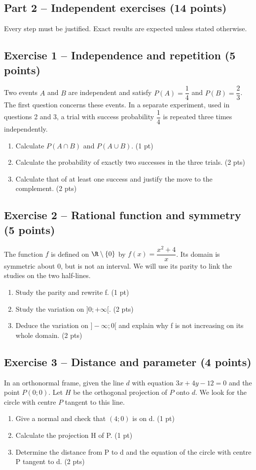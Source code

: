\clearpage\subsection*{Part 2 -- Independent exercises (14 points)}
Every step must be justified. Exact results are expected unless stated otherwise.
\subsection*{Exercise 1 -- Independence and repetition (5 points)}
Two events $A$ and $B$ are independent and satisfy $P(A)=\dfrac14$ and $P(B)=\dfrac23$. The first question concerns these events. In a separate experiment, used in questions 2 and 3, a trial with success probability $\dfrac14$ is repeated three times independently.
\begin{enumerate}
\item Calculate $P(A\cap B)$ and $P(A\cup B)$. \hfill(1 pt)
\item Calculate the probability of exactly two successes in the three trials. \hfill(2 pts)
\item Calculate that of at least one success and justify the move to the complement. \hfill(2 pts)
\end{enumerate}
\subsection*{Exercise 2 -- Rational function and symmetry (5 points)}
The function $f$ is defined on $\R\setminus\{0\}$ by $f(x)=\dfrac{x^2+4}{x}$. Its domain is symmetric about 0, but is not an interval. We will use its parity to link the studies on the two half-lines.
\begin{enumerate}
\item Study the parity and rewrite f. \hfill(1 pt)
\item Study the variation on $]0;+\infty[$. \hfill(2 pts)
\item Deduce the variation on $]-\infty;0[$ and explain why f is not increasing on its whole domain. \hfill(2 pts)
\end{enumerate}
\subsection*{Exercise 3 -- Distance and parameter (4 points)}
In an orthonormal frame, given the line $d$ with equation $3x+4y-12=0$ and the point $P(0;0)$. Let $H$ be the orthogonal projection of $P$ onto $d$. We look for the circle with centre $P$ tangent to this line.
\begin{enumerate}
\item Give a normal and check that $(4;0)$ is on d. \hfill(1 pt)
\item Calculate the projection H of P. \hfill(1 pt)
\item Determine the distance from P to d and the equation of the circle with centre P tangent to d. \hfill(2 pts)
\end{enumerate}
